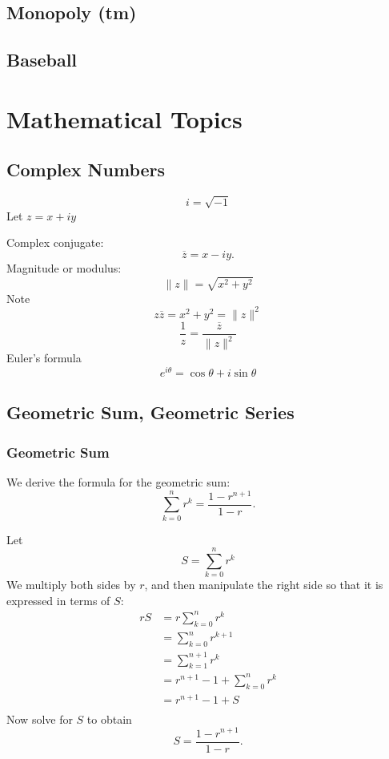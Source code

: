 \documentclass[reqno]{immbook}
\numberwithin{equation}{chapter}
\numberwithin{question}{section}
\numberwithin{theorem}{chapter}
\numberwithin{figure}{chapter}
\theoremstyle{definition}
\begin{document}
\section{Monopoly (tm)}
\section{Baseball}

%
\appendix
%
%
%

\chapter{Mathematical Topics}
%
%
\section{Complex Numbers}
%
\[
    i = \sqrt{-1}
\]
Let $z=x+iy$

\medskip
\noindent
Complex conjugate:
\[
   \overline{z} = x-iy.
\]
Magnitude or modulus:
\[
   \| z \| = \sqrt{x^2+y^2}
\]
Note
\[
   z \overline{z} = x^2+y^2 = \| z \|^2
\]
\[
   \frac{1}{z} = \frac{\overline{z}}{\|z\|^2}
\]
Euler's formula
\begin{equation}
   e^{i\theta} = \cos\theta + i \sin\theta
   \label{eqn:EULER}
\end{equation}
%
\section{Geometric Sum, Geometric Series}

\subsection*{Geometric Sum}
We derive the formula for the
geometric sum:
\begin{equation}
  \sum_{k=0}^{n} r^k = \frac{1- r^{n+1}}{1-r}.
\label{eqn:geometricsum}
\end{equation}

Let
\begin{equation}
  S = \sum_{k=0}^{n} r^k
\end{equation}
We multiply both sides by $r$, and then manipulate
the right side so that it is expressed in terms of $S$:
\begin{equation}
\begin{split}
  r S & = r \sum_{k=0}^{n}r^k \\
     & = \sum_{k=0}^{n}r^{k+1} \\
     & = \sum_{k=1}^{n+1}r^k \\
     & = r^{n+1} - 1 + \sum_{k=0}^{n}r^k \\
     & = r^{n+1} - 1 + S \\
\end{split}
\label{eqn:derivation}
\end{equation}
Now solve for $S$ to obtain
\begin{equation}
   S = \frac{1-r^{n+1}}{1-r} .
\end{equation}
\end{document}
